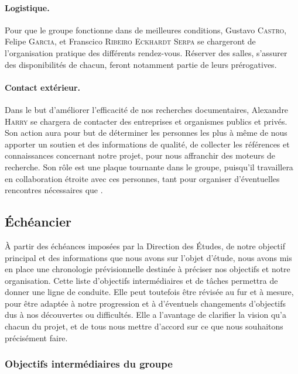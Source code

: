 \documentclass[a4paper, 12pt,twoside]{article}
\begin{document}
		\paragraph{Logistique. } Pour que le groupe fonctionne dans de meilleures conditions, \textcolor{bleu303}{Gustavo \textsc{Castro}}, \textcolor{bleu303}{Felipe \textsc{Garcia}}, et \textcolor{bleu303}{Franscico \textsc{Ribeiro Eckhardt Serpa}} se chargeront de l'organisation pratique des différents rendez-vous. Réserver des salles, s'assurer des disponibilités de chacun, feront notamment partie de leurs prérogatives.
		
		\paragraph{Contact extérieur. }  Dans le but d'améliorer l'efficacité de nos recherches documentaires, \textcolor{bleu303}{Alexandre \textsc{Harry}} se chargera de contacter des entreprises et organismes publics et privés. Son action aura pour but de déterminer les personnes les plus à même de nous apporter un soutien et des informations de qualité, de collecter les références et connaissances concernant notre projet, pour nous affranchir des moteurs de recherche. Son rôle est une plaque tournante dans le groupe, puisqu'il travaillera en collaboration étroite avec ces personnes, tant pour organiser d'éventuelles rencontres nécessaires que .
		
	\subsection{Échéancier}
	
	À partir des échéances imposées par la Direction des Études, de notre objectif principal et des informations que nous avons sur l'objet d'étude, nous avons mis en place une chronologie prévisionnelle destinée à préciser nos objectifs et notre organisation. Cette liste d'objectifs intermédiaires et de tâches permettra de donner une ligne de conduite. Elle peut toutefois être révisée au fur et à mesure, pour être adaptée à notre progression et à d'éventuels changements d'objectifs dus à nos découvertes ou difficultés. Elle a l'avantage de clarifier la vision qu'a chacun du projet, et de tous nous mettre d'accord sur ce que nous souhaitons précisément faire.
	
		\subsubsection{Objectifs intermédiaires du groupe}
		
\end{document}
